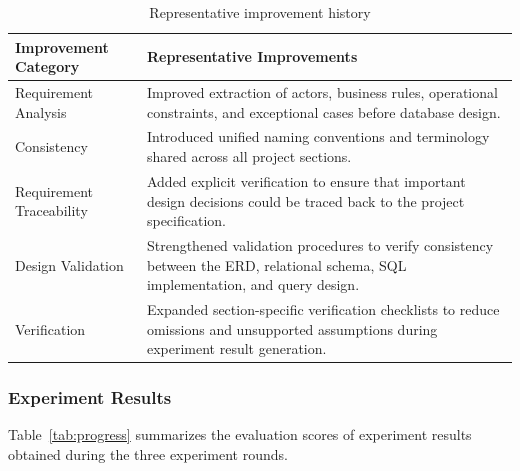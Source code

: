 \begin{table}[H]
\centering

\renewcommand{\arraystretch}{1.35}
\caption{Representative improvement history}
\label{tab:history}

\begin{tabularx}{\linewidth}
{
>{\raggedright\arraybackslash}p{3.5cm}
X
}

\toprule

\textbf{Improvement Category}
&
\textbf{Representative Improvements}

\\

\midrule

Requirement Analysis
&
Improved extraction of actors, business rules, operational constraints, and exceptional cases before database design.
\\

Consistency
&
Introduced unified naming conventions and terminology shared across all project sections.
\\

Requirement Traceability
&
Added explicit verification to ensure that important design decisions could be traced back to the project specification.
\\

Design Validation
&
Strengthened validation procedures to verify consistency between the ERD, relational schema, SQL implementation, and query design.
\\

Verification
&
Expanded section-specific verification checklists to reduce omissions and unsupported assumptions during experiment result generation.
\\

\bottomrule

\end{tabularx}

\end{table}

\subsubsection{Experiment Results}

Table~\ref{tab:progress} summarizes the evaluation scores of experiment results obtained during the three experiment rounds.

